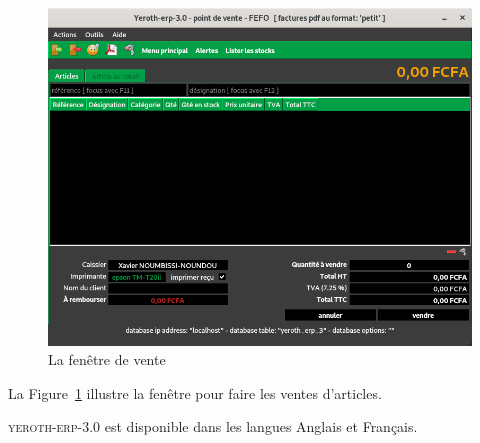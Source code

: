 \documentclass[a4paper, 10pt, twocolumn]{article}
\newcommand{\yeren}{\textsc{yeroth-erp-3.0}\xspace}
\begin{document}
\begin{figure}[!htbp]
\centering
\includegraphics[scale=0.33]{../images/yeren-fenetre-caissier.png}
\caption{La fen\^etre de vente}
\label{fig:fenetre-de-vente}
\end{figure}

La Figure~\ref{fig:fenetre-de-vente} illustre la
fen\^etre pour faire les ventes d'articles.

\yeren est disponible dans les langues Anglais et Fran\c{c}ais. 
\end{document}
